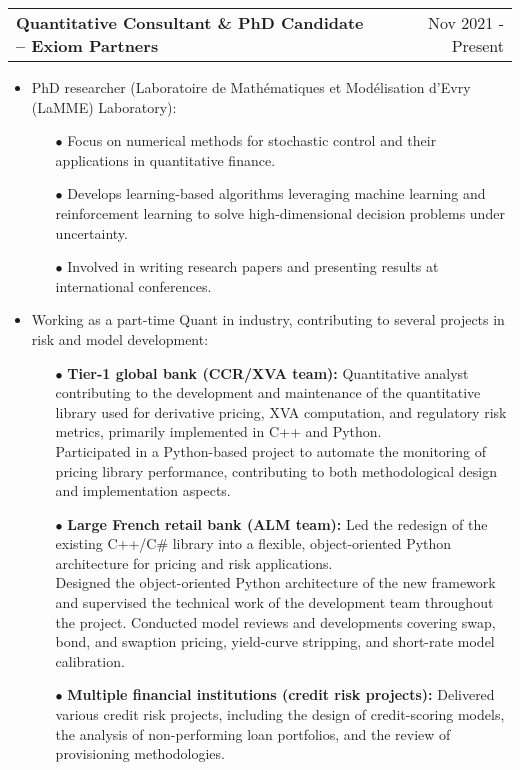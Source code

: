 \documentclass[a4paper,12pt]{article}
\makeatletter
\newenvironment{joblong}[2]
    {
    \begin{tabularx}{\linewidth}{@{}l X r@{}}
    \textbf{#1} & \hfill &  #2 \\[3.75pt]
    \end{tabularx}
    \begin{minipage}[t]{\linewidth}
    \begin{itemize}[nosep,after=\strut, leftmargin=1em, itemsep=3pt,label=--]
    }
    {
    \end{itemize}
    \end{minipage}    
    }
\makeatother
\begin{document}
	\begin{joblong}{Quantitative Consultant \& PhD Candidate -- Exiom Partners}{Nov 2021 - Present}
	\item PhD researcher (Laboratoire de Mathématiques et Modélisation d'Evry (LaMME) Laboratory):
		\begin{itemize}
			\item[$\bullet$] Focus on numerical methods for stochastic control and their applications in quantitative finance.
			\item[$\bullet$] Develops learning-based algorithms leveraging machine learning and reinforcement learning to solve high-dimensional decision problems under uncertainty.
			\item[$\bullet$] Involved in writing research papers and presenting results at international conferences. \\
		\end{itemize}
	\item Working as a part-time Quant in industry, contributing to several projects in risk and model development:
		\begin{itemize}
			\item[$\bullet$] \textbf{Tier-1 global bank (CCR/XVA team):} 
			Quantitative analyst contributing to the development and maintenance of the quantitative library used for derivative pricing, XVA computation, and regulatory risk metrics, primarily implemented in C++ and Python. \\
			Participated in a Python-based project to automate the monitoring of pricing library performance, contributing to both methodological design and implementation aspects. \\
			\item[$\bullet$] \textbf{Large French retail bank (ALM team):} Led the redesign of the existing C++/C\# library into a flexible, object-oriented Python architecture for pricing and risk applications. \\
			Designed the object-oriented Python architecture of the new framework and supervised the technical work of the development team throughout the project. 
			Conducted model reviews and developments covering swap, bond, and swaption pricing, yield-curve stripping, and short-rate model calibration. \\
			\item[$\bullet$] \textbf{Multiple financial institutions (credit risk projects):} 
			Delivered various credit risk projects, including the design of credit-scoring models, the analysis of non-performing loan portfolios, and the review of provisioning methodologies. \\

\end{itemize}
\end{joblong}
\end{document}
